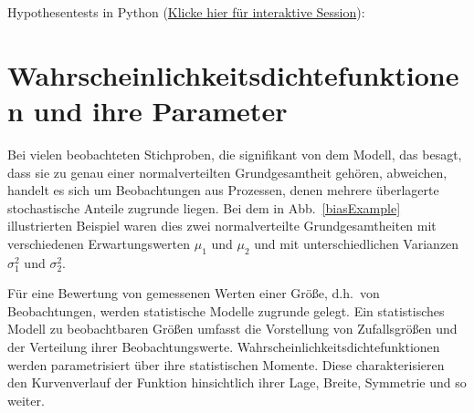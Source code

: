 Hypothesentests in Python (\href{https://mybinder.org/v2/gh/dhueser/MDA-Vorlesung-iprom-tu-bs/master?urlpath=/lab/tree/vorlesung/05_vorlesung/code/hypothesentests.ipynb}{Klicke hier für interaktive Session}): 



\section{Wahrscheinlichkeitsdichtefunktionen und ihre Parameter}

Bei vielen beobachteten Stichproben, die signifikant von dem Modell, das besagt, dass sie zu genau einer
normalverteilten Grundgesamtheit gehören, abweichen, handelt
es sich um Beobachtungen aus Prozessen, denen mehrere überlagerte stochastische Anteile
zugrunde liegen. Bei dem in Abb.~\ref{biasExample} illustrierten Beispiel waren dies
zwei normalverteilte Grundgesamtheiten mit verschiedenen Erwartungswerten $\mu_1$ und
$\mu_2$ und mit unterschiedlichen Varianzen $\sigma^2_1$ und $\sigma^2_2$.

Für eine Bewertung von gemessenen Werten einer Größe, d.h.\ von Beobachtungen, werden statistische
Modelle zugrunde gelegt. Ein statistisches Modell zu beobachtbaren Größen umfasst die 
Vorstellung von Zufallsgrößen und der Verteilung ihrer Beobachtungswerte.
Wahrscheinlichkeitsdichtefunktionen werden parametrisiert über ihre statistischen Momente.
Diese charakterisieren den Kurvenverlauf der Funktion hinsichtlich ihrer Lage, Breite,
Symmetrie und so weiter.

